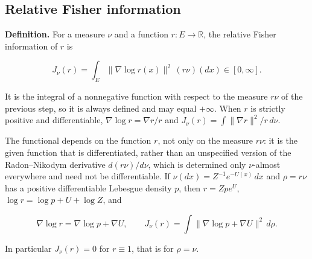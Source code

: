 \documentclass[11pt,a4paper]{report}
\begin{document}
\subsection{\texorpdfstring{Relative Fisher information}{Relative Fisher information}}
\label{report-step-UnadjustedLangevin-LSI-FunctionalInequality-lean-2}


\textbf{Definition.} For a measure \(\nu\) and a function \(r:E\to\mathbb R\), the relative Fisher information of \(r\) is


\[J_\nu(r)=\int_E\|\nabla\log r(x)\|^2\,(r\nu)(dx)\in[0,\infty].\]


It is the integral of a nonnegative function with respect to the measure \(r\nu\) of the previous step, so it is always defined and may equal \(+\infty\). When \(r\) is strictly positive and differentiable, \(\nabla\log r=\nabla r/r\) and \(J_\nu(r)=\int\|\nabla r\|^2/r\,d\nu\).




The functional depends on the function \(r\), not only on the measure \(r\nu\): it is the given function that is differentiated, rather than an unspecified version of the Radon–Nikodym derivative \(d(r\nu)/d\nu\), which is determined only \(\nu\)-almost everywhere and need not be differentiable. If \(\nu(dx)=Z^{-1}e^{-U(x)}\,dx\) and \(\rho=r\nu\) has a positive differentiable Lebesgue density \(p\), then \(r=Zpe^{U}\), \(\log r=\log p+U+\log Z\), and


\[\nabla\log r=\nabla\log p+\nabla U,\qquad J_\nu(r)=\int\|\nabla\log p+\nabla U\|^2\,d\rho.\]


In particular \(J_\nu(r)=0\) for \(r\equiv1\), that is for \(\rho=\nu\).
\end{document}
